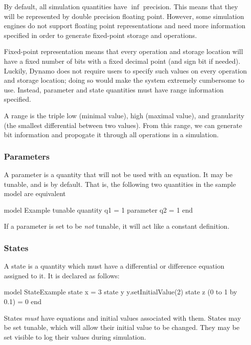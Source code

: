 \documentclass[11pt]{article}
\begin{document}
By default, all simulation quantities have $\inf$ precision.  This
means that they will be represented by double precision floating
point.  However, some simulation engines do not support floating point
representations and need more information specified in order to
generate fixed-point storage and operations.

Fixed-point representation means that every operation and storage
location will have a fixed number of bits with a fixed decimal point
(and sign bit if needed).  Luckily, Dynamo does not require users to
specify such values on every operation and storage location; doing so
would make the system extremely cumbersome to use.  Instead, parameter
and state quantities must have range information specified.  

A range is the triple low (minimal value), high (maximal value), and
granularity (the smallest differential between two values).  From this
range, we can generate bit information and propogate it through all
operations in a simulation.



\subsubsection{Parameters}
A parameter is a quantity that will not be used with an equation.  It
may be tunable, and is by default.  That is, the following two
quantities in the sample model are equivalent

\begin{dsl}
model Example
  tunable quantity q1 = 1
  parameter q2 = 1
end
\end{dsl}

If a parameter is set to be {\it not} tunable, it will act like a
constant definition.

\subsubsection{States}

A state is a quantity which must have a differential or difference
equation assigned to it.  It is declared as follows:

\begin{dsl}
model StateExample
  state x = 3
  state y
  y.setInitialValue(2)
  state z (0 to 1 by 0.1) = 0
end
\end{dsl}

States {\it must} have equations and initial values associated with
them.  States may be set tunable, which will allow their initial value
to be changed.  They may be set visible to log their values during
simulation.
\end{document}
